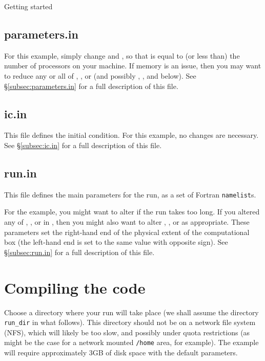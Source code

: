 \begin{chapter}{\label{cha:quickstart}Getting started}
  \subsection{parameters.in}
  For this example, simply change  and , so
  that  is equal to (or less than) the number of
  processors on your machine.  If memory is an issue, then you may want to
  reduce any or all of , , or  (and possibly
  , , and  below).  See
  \S\ref{subsec:parameters.in} for a full description of this file.  

  \subsection{ic.in}
  This file defines the initial condition.  For this example, no changes are
  necessary.  See \S\ref{subsec:ic.in} for a full description of this file.

  \subsection{\label{subsec:runin}run.in}
  This file defines the main parameters for the run, as a set of Fortran
  \verb"namelist"s.
  
  For the  example, you might want to alter
   if the run takes too long.  If you altered any of
  , , or  in , then you
  might also want to alter , , or  as
  appropriate.  These parameters set the right-hand end of the physical extent
  of the computational box (the left-hand end is set to the same value with
  opposite sign).  See \S\ref{subsec:run.in} for a full description of this
  file.

  \section{Compiling the code}
  Choose a directory where your run will take place (we shall assume the
  directory \verb"run_dir" in what follows).  This directory should not be on a
  network file system (NFS), which will likely be too slow, and possibly under
  quota restrictions (as might be the case for a network mounted \verb"/home"
  area, for example).  The  example will require approximately
  3GB of disk space with the default parameters.


\end{chapter}
